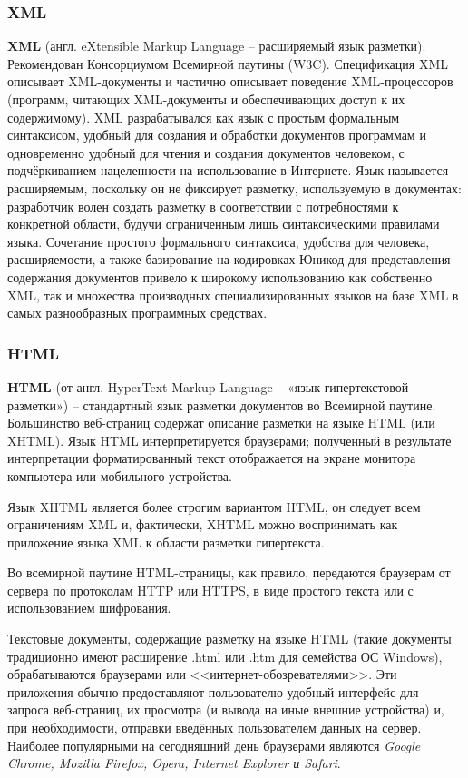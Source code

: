 \documentclass[a4paper]{article}
\begin{document}
\subsubsection{XML}

\textbf{XML} (англ. eXtensible Markup Language -- расширяемый язык разметки). Рекомендован Консорциумом Всемирной паутины (W3C). Спецификация XML описывает XML-документы и частично описывает поведение XML-процессоров (программ, читающих XML-документы и обеспечивающих доступ к их содержимому). XML разрабатывался как язык с простым формальным синтаксисом, удобный для создания и обработки документов программам и одновременно удобный для чтения и создания документов человеком, с подчёркиванием нацеленности на использование в Интернете. Язык называется расширяемым, поскольку он не фиксирует разметку, используемую в документах: разработчик волен создать разметку в соответствии с потребностями к конкретной области, будучи ограниченным лишь синтаксическими правилами языка. Сочетание простого формального синтаксиса, удобства для человека, расширяемости, а также базирование на кодировках Юникод для представления содержания документов привело к широкому использованию как собственно XML, так и множества производных специализированных языков на базе XML в самых разнообразных программных средствах.

\subsubsection{HTML}

\textbf{HTML} (от англ. HyperText Markup Language -- «язык гипертекстовой разметки») -- стандартный язык разметки документов во Всемирной паутине. Большинство веб-страниц содержат описание разметки на языке HTML (или XHTML). Язык HTML интерпретируется браузерами; полученный в результате интерпретации форматированный текст отображается на экране монитора компьютера или мобильного устройства.

Язык XHTML является более строгим вариантом HTML, он следует всем ограничениям XML и, фактически, XHTML можно воспринимать как приложение языка XML к области разметки гипертекста.

Во всемирной паутине HTML-страницы, как правило, передаются браузерам от сервера по протоколам HTTP или HTTPS, в виде простого текста или с использованием шифрования.

Текстовые документы, содержащие разметку на языке HTML (такие документы традиционно имеют расширение .html или .htm для семейства ОС Windows), обрабатываются браузерами или <<интернет-обозревателями>>. Эти приложения обычно предоставляют пользователю удобный интерфейс для запроса веб-страниц, их просмотра (и вывода на иные внешние устройства) и, при необходимости, отправки введённых пользователем данных на сервер. Наиболее популярными на сегодняшний день браузерами являются \textit{Google Chrome, Mozilla Firefox, Opera, Internet Explorer и Safari}.
\end{document}
